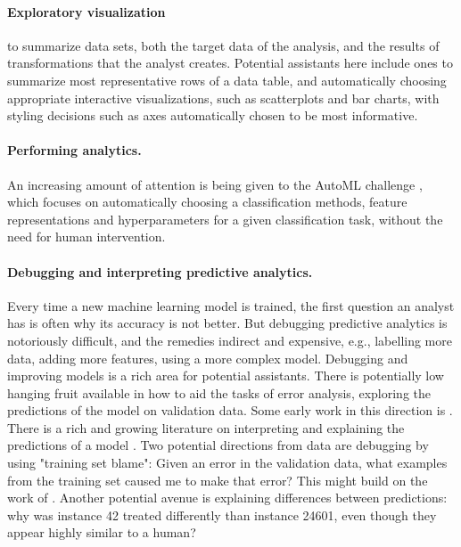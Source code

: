 \documentclass[sigplan,preprint,10pt]{acmart}\settopmatter{printfolios=true,printccs=false,printacmref=false}
\theoremstyle{plain}
\theoremstyle{definition}
\begin{document}
{\paragraph{Exploratory visualization} to summarize
data sets, both the target data of the analysis,
and the results of transformations that the analyst
creates. Potential assistants here include ones
to summarize most representative rows of a data table,
and automatically choosing appropriate interactive
visualizations, such as scatterplots and bar charts,
with styling decisions such as axes automatically
chosen to be most informative.

\paragraph{Performing analytics.}
An increasing amount of attention is being
given to the AutoML challenge \cite{guyon_review_2016}, which focuses
on automatically choosing a classification
methods, feature representations and hyperparameters
for a given classification task, without the need for human intervention.

\paragraph{Debugging and interpreting predictive analytics.}
Every time a new machine learning model is trained,
the first question an analyst has is often
why its accuracy is not better. But
debugging predictive analytics is notoriously difficult, and the remedies indirect and expensive,
 e.g., labelling more data, adding more features,
 using a more complex model. Debugging and improving
 models is a rich area for potential assistants.
 There is potentially low hanging fruit available
 in how to aid the tasks of
error analysis, exploring the
predictions of the model 
on validation data. Some early work in this direction is
\cite{saleema}.
There is a rich and growing literature on
interpreting and explaining the predictions
of a model \cite{lipton:mythos,doshi-velez17,ribiero2016lime,darksight}.
Two potential directions from data are
debugging by using
"training set blame": Given an error in the validation data, what examples from the training set caused me to make that error? This might build on the work of \cite{percy}.
Another potential avenue is explaining
differences between predictions: why was instance 42 treated differently than instance 24601, even though they appear highly similar to a human?
}

\vspace*{1em}
\end{document}

